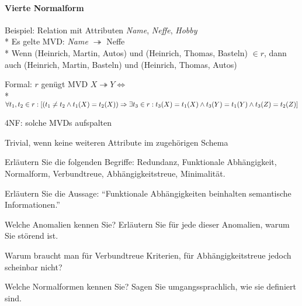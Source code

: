 \paragraph{Vierte Normalform}
\begin{items}
	\item Beispiel: Relation mit Attributen \emph{Name}, \emph{Neffe}, \emph{Hobby} \\*
		Es gelte MVD: \emph{Name} \( \twoheadrightarrow \) Neffe \\*
		Wenn (Heinrich, Martin, Autos) und (Heinrich, Thomas, Basteln) 
		\( \in r \), dann auch 
		(Heinrich, Martin, Basteln) und (Heinrich, Thomas, Autos)
	\item Formal: \( r \) genügt MVD \( X \twoheadrightarrow Y \Leftrightarrow \) \\*
		\( \forall t_1, t_2 \in r: [(t_1 \neq t_2 \wedge t_1(X) = t_2(X)) \\* \Rightarrow \exists t_3 \in r: t_3(X)=t_1(X) \wedge t_3(Y)=t_1(Y) \wedge t_3(Z) = t_2(Z) ] \) 
	\item 4NF: solche MVDs aufspalten
	\item Trivial, wenn keine weiteren Attribute im zugehörigen Schema
\end{items}

\begin{fragen}
	\item Erläutern Sie die folgenden Begriffe: Redundanz, Funktionale Abhängigkeit, Normalform, Verbundtreue, Abhängigkeitstreue, Minimalität.
	\item Erläutern Sie die Aussage: ``Funktionale Abhängigkeiten beinhalten semantische Informationen.''
	\item Welche Anomalien kennen Sie? Erläutern Sie für jede dieser Anomalien, warum Sie störend ist.
	\item Warum braucht man für Verbundtreue Kriterien, für Abhängigkeitstreue jedoch scheinbar nicht?
	\item Welche Normalformen kennen Sie? Sagen Sie umgangssprachlich, wie sie definiert sind.
\end{fragen}